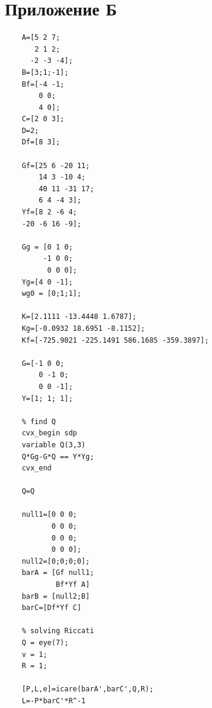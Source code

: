 \documentclass[a4paper, 12pt]{article}
\begin{document}
    \section{Приложение Б}
    \begin{lstlisting}[label=task2, caption={Программа для задания 2}]
    % plant parameters
    A=[5 2 7;
       2 1 2;
      -2 -3 -4];
    B=[3;1;-1];
    Bf=[-4 -1;
        0 0;
        4 0];
    C=[2 0 3];
    D=2;
    Df=[8 3];

    Gf=[25 6 -20 11;
        14 3 -10 4;
        40 11 -31 17;
        6 4 -4 3];
    Yf=[8 2 -6 4;
    -20 -6 16 -9];

    Gg = [0 1 0;
         -1 0 0;
          0 0 0];
    Yg=[4 0 -1];
    wg0 = [0;1;1];

    K=[2.1111 -13.4448 1.6787];
    Kg=[-0.0932 18.6951 -8.1152];
    Kf=[-725.9021 -225.1491 586.1685 -359.3897];

    G=[-1 0 0;
        0 -1 0;
        0 0 -1];
    Y=[1; 1; 1];

    % find Q
    cvx_begin sdp
    variable Q(3,3)
    Q*Gg-G*Q == Y*Yg;
    cvx_end

    Q=Q

    null1=[0 0 0;
           0 0 0;
           0 0 0;
           0 0 0];
    null2=[0;0;0;0];
    barA = [Gf null1;
            Bf*Yf A]
    barB = [null2;B]
    barC=[Df*Yf C]

    % solving Riccati
    Q = eye(7);
    v = 1;
    R = 1;

    [P,L,e]=icare(barA',barC',Q,R);
    L=-P*barC'*R^-1
    \end{lstlisting}
\end{document}
